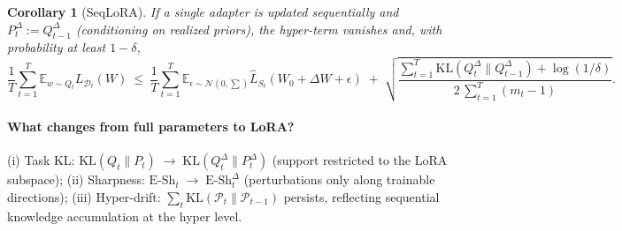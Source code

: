 \documentclass{article} %
\newtheorem{lemma}{Lemma}
\newtheorem{corollary}{Corollary}
\begin{document}
\begin{corollary}[SeqLoRA]\label{cor:seq-lora}
If a single adapter is updated sequentially and $P_t^{\Delta}:=Q_{t-1}^{\Delta}$ (conditioning on realized priors),
the hyper-term vanishes and, with probability at least $1-\delta$,
\[
\frac1T\sum_{t=1}^T \mathbb{E}_{w\sim Q_t}L_{\mathcal{D}_t}(W)
\ \le\
\frac1T\sum_{t=1}^T \mathbb{E}_{\epsilon \sim \mathcal{N}(0,\sum)}\widehat L_{S_t}(W_0+\Delta W+\epsilon)
\;+\;
\sqrt{\frac{
\sum_{t=1}^T \mathrm{KL}(Q_t^{\Delta}\|Q_{t-1}^{\Delta})
+\log(1/\delta)}
{2\,\sum_{t=1}^T (m_t-1)}}.
\]
\end{corollary}

\paragraph{What changes from full parameters to LoRA?}
(i) Task KL: $\mathrm{KL}(Q_t\|P_t)\;\to\;\mathrm{KL}(Q_t^{\Delta}\|P_t^{\Delta})$ (support restricted to the LoRA subspace);
(ii) Sharpness: $\mathrm{E\text{-}Sh}_t\;\to\;\mathrm{E\text{-}Sh}^{\Delta}_t$ (perturbations only along trainable directions);
(iii) Hyper-drift: $\sum_t \mathrm{KL}(\mathcal{P}_t\|\mathcal{P}_{t-1})$ persists, reflecting sequential knowledge accumulation at the hyper level.




\end{document}
